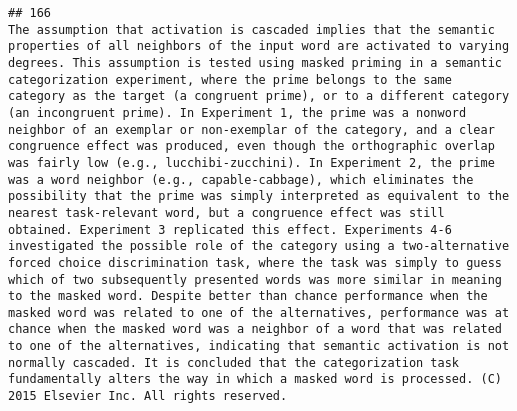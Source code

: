 \documentclass[
  english,
  man]{apa6}
\begin{document}
\begin{verbatim}
## 166                                                                                                                                                                                                                                                                                                                                                                                                                                                                                                                                                                                                                                                                                                                                                                                                                                                                                                                                                                                                                                                                   The assumption that activation is cascaded implies that the semantic properties of all neighbors of the input word are activated to varying degrees. This assumption is tested using masked priming in a semantic categorization experiment, where the prime belongs to the same category as the target (a congruent prime), or to a different category (an incongruent prime). In Experiment 1, the prime was a nonword neighbor of an exemplar or non-exemplar of the category, and a clear congruence effect was produced, even though the orthographic overlap was fairly low (e.g., lucchibi-zucchini). In Experiment 2, the prime was a word neighbor (e.g., capable-cabbage), which eliminates the possibility that the prime was simply interpreted as equivalent to the nearest task-relevant word, but a congruence effect was still obtained. Experiment 3 replicated this effect. Experiments 4-6 investigated the possible role of the category using a two-alternative forced choice discrimination task, where the task was simply to guess which of two subsequently presented words was more similar in meaning to the masked word. Despite better than chance performance when the masked word was related to one of the alternatives, performance was at chance when the masked word was a neighbor of a word that was related to one of the alternatives, indicating that semantic activation is not normally cascaded. It is concluded that the categorization task fundamentally alters the way in which a masked word is processed. (C) 2015 Elsevier Inc. All rights reserved.

\end{verbatim}
\end{document}
